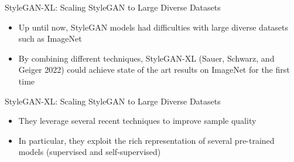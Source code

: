 \begin{frame}{StyleGAN-XL: Scaling StyleGAN to Large Diverse Datasets}
\protect\hypertarget{stylegan-xl-scaling-stylegan-to-large-diverse-datasets}{}

\begin{itemize}
\tightlist
\item
  Up until now, StyleGAN models had difficulties with large diverse
  datasets such as ImageNet
\item
  By combining different techniques, StyleGAN-XL (Sauer, Schwarz, and
  Geiger 2022) could achieve state of the art results on ImageNet for
  the first time
\end{itemize}


\end{frame}

\begin{frame}{StyleGAN-XL: Scaling StyleGAN to Large Diverse Datasets}
\protect\hypertarget{stylegan-xl-scaling-stylegan-to-large-diverse-datasets-1}{}

\begin{itemize}
\tightlist
\item
  They leverage several recent techniques to improve sample quality
\item
  In particular, they exploit the rich representation of several
  pre-trained models (supervised and self-supervised)
\end{itemize}


\end{frame}

